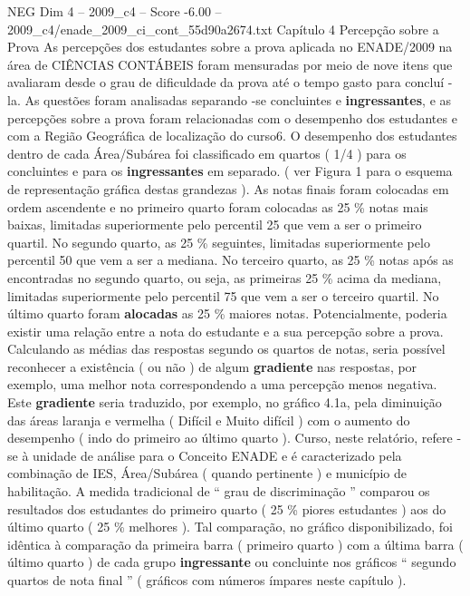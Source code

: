 \begin{textsample}{NEG Dim 4 – 2009\_c4 – Score -6.00 – 2009\_c4/enade\_2009\_ci\_cont\_55d90a2674.txt}  \label{ex:f4_neg_023}
Capítulo 4 Percepção sobre a Prova As percepções dos estudantes sobre a prova aplicada no ENADE/2009 na área de CIÊNCIAS CONTÁBEIS foram mensuradas por meio de nove itens que avaliaram desde o grau de dificuldade da prova até o tempo gasto para concluí -la.
As questões foram analisadas separando -se concluintes e \textbf{ingressantes}, e as percepções sobre a prova foram relacionadas com o desempenho dos estudantes e com a Região Geográfica de localização do curso6.
O desempenho dos estudantes dentro de cada Área/Subárea foi classificado em quartos ( 1/4 ) para os concluintes e para os \textbf{ingressantes} em separado. ( ver Figura 1 para o esquema de representação gráfica destas grandezas ).
As notas finais foram colocadas em ordem ascendente e no primeiro quarto foram colocadas as 25 \% notas mais baixas, limitadas superiormente pelo percentil 25 que vem a ser o primeiro quartil.
No segundo quarto, as 25 \% seguintes, limitadas superiormente pelo percentil 50 que vem a ser a mediana.
No terceiro quarto, as 25 \% notas após as encontradas no segundo quarto, ou seja, as primeiras 25 \% acima da mediana, limitadas superiormente pelo percentil 75 que vem a ser o terceiro quartil.
No último quarto foram \textbf{alocadas} as 25 \% maiores notas.
Potencialmente, poderia existir uma relação entre a nota do estudante e a sua percepção sobre a prova.
Calculando as médias das respostas segundo os quartos de notas, seria possível reconhecer a existência ( ou não ) de algum \textbf{gradiente} nas respostas, por exemplo, uma melhor nota correspondendo a uma percepção menos negativa.
Este \textbf{gradiente} seria traduzido, por exemplo, no gráfico 4.1a, pela diminuição das áreas laranja e vermelha ( Difícil e Muito difícil ) com o aumento do desempenho ( indo do primeiro ao último quarto ).
Curso, neste relatório, refere -se à unidade de análise para o Conceito ENADE e é caracterizado pela combinação de IES, Área/Subárea ( quando pertinente ) e município de habilitação.
A medida tradicional de “ grau de discriminação ” comparou os resultados dos estudantes do primeiro quarto ( 25 \% piores estudantes ) aos do último quarto ( 25 \% melhores ).
Tal comparação, no gráfico disponibilizado, foi idêntica à comparação da primeira barra ( primeiro quarto ) com a última barra ( último quarto ) de cada grupo \textbf{ingressante} ou concluinte nos gráficos “ segundo quartos de nota final ” ( gráficos com números ímpares neste capítulo ).

\end{textsample}

